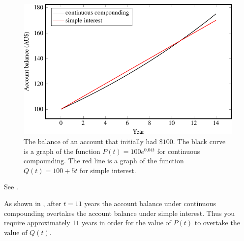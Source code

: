 \documentclass[a4paper,oneside,12pt]{article}
\begin{document}
\begin{problem}
{\begin{solution}
\begin{figure}[!htbp]
\centering
\includegraphics[scale=1.1]{image/12/interest.pdf}
\caption{%
  The balance of an account that initially had $\$100$.  The black
  curve is a graph of the function $P(t) = 100 e^{0.04 t}$ for
  continuous compounding.  The red line is a graph of the function
  $Q(t) = 100 + 5t$ for simple interest.
}
\label{fig:logarithm:interest}
\end{figure}

\begin{table}[!htbp]
\centering

\caption{%
  The account balance under continuous compound interest~(the middle
  column) and simple interest~(the right-most column).  The time $t$
  is in years and the account balance is in Australian dollars.
}
\label{tab:logarithm:interest}
\end{table}

See .

As shown in , after $t = 11$ years the
account balance under continuous compounding overtakes the account
balance under simple interest.  Thus you require approximately $11$
years in order for the value of $P(t)$ to overtake the value of
$Q(t)$.
\end{solution}
}{}


\end{problem}
\end{document}
